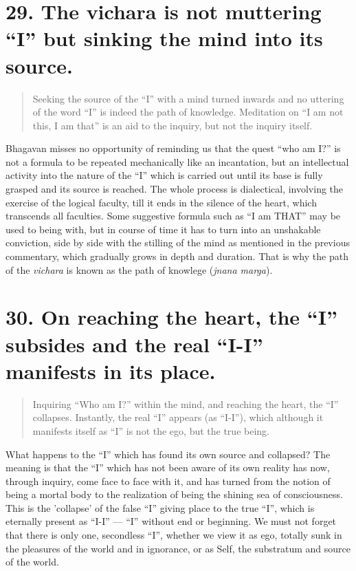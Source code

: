 \documentclass[12pt]{report}
\begin{document}
\index{}

\section{29. The vichara is not muttering ``I'' but sinking the mind
  into its source.} 

\begin{quote}
  Seeking the source of the ``I'' with a mind turned inwards and no
  uttering of the word ``I'' is indeed the path of
  knowledge. Meditation on ``I am not this, I am that'' is an aid to
  the inquiry, but not the inquiry itself.
\end{quote}


Bhagavan misses no opportunity of reminding us that the quest ``who am
I?'' is not a formula to be repeated mechanically like an incantation,
but an intellectual activity into the nature of the ``I'' which is
carried out until its base is fully grasped and its source is
reached. The whole process is dialectical, involving the exercise of
the logical faculty, till it ends in the silence of the heart, which
transcends all faculties. Some suggestive formula such as ``I am
THAT'' may be used to being with, but in course of time it has to turn
into an unshakable conviction, side by side with the stilling of the
mind as mentioned in the previous commentary, which gradually grows in
depth and duration. That is why the path of the \emph{vichara} is
known as the path of knowlege (\emph{jnana marga}).

\section{30. On reaching the heart, the ``I'' subsides and the real
  ``I-I'' manifests in its place.} 

\begin{quote}
  Inquiring ``Who am I?'' within the mind, and reaching the heart, the
  ``I'' collapses. Instantly, the real ``I'' appears (as ``I-I''),
  which although it manifests itself as ``I'' is not the ego, but the
  true being.
\end{quote}


What happens to the ``I'' which has found its own source and
collapsed? The meaning is that the ``I'' which has not been aware of
its own reality has now, through inquiry, come face to face with it,
and has turned from the notion of being a mortal body to the
realization of being the shining sea of consciousness. This is the
'collapse' of the false ``I'' giving place to the true ``I'', which is
eternally present as ``I-I'' --- ``I'' without end or beginning. We
must not forget that there is only one, secondless ``I'', whether we
view it as ego, totally sunk in the pleasures of the world and in
ignorance, or as Self, the substratum and source of the world.
\end{document}
